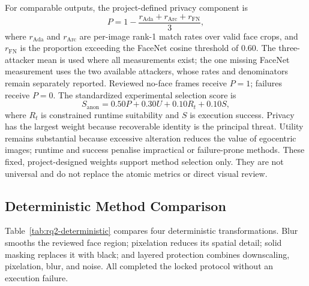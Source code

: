 \documentclass[10pt,twocolumn]{IEEEtran}
\begin{document}
For comparable outputs, the project-defined privacy component is
\begin{equation}
P=1-\frac{r_{\mathrm{Ada}}+r_{\mathrm{Arc}}+r_{\mathrm{FN}}}{3},
\label{eq:anon-privacy}
\end{equation}
where $r_{\mathrm{Ada}}$ and $r_{\mathrm{Arc}}$ are per-image rank-1 match
rates over valid face crops, and $r_{\mathrm{FN}}$ is the proportion exceeding
the FaceNet cosine threshold of 0.60. The three-attacker mean is used where all
measurements exist; the one missing FaceNet measurement uses the two available
attackers, whose rates and denominators remain separately reported. Reviewed
no-face frames receive $P=1$; failures receive $P=0$. The standardized
experimental selection score is
\begin{equation}
S_{\mathrm{anon}}=0.50P+0.30U+0.10R_t+0.10S,
\label{eq:anon-score}
\end{equation}
where $R_t$ is constrained runtime suitability and $S$ is execution success.
Privacy has the largest weight because recoverable identity is the principal
threat. Utility remains substantial because excessive alteration reduces the
value of egocentric images; runtime and success penalise impractical or
failure-prone methods. These fixed, project-designed weights support method
selection only. They are not universal and do not replace the atomic metrics or
direct visual review.

\subsection{Deterministic Method Comparison}

Table~\ref{tab:rq2-deterministic} compares four deterministic transformations.
Blur smooths the reviewed face region; pixelation reduces its spatial detail;
solid masking replaces it with black; and layered protection combines
downscaling, pixelation, blur, and noise. All completed the locked protocol
without an execution failure.
\end{document}
